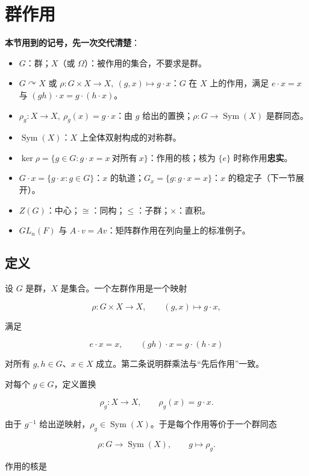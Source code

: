 \section{群作用}


\textbf{本节用到的记号，先一次交代清楚}：

\begin{itemize}
\item $G$：群；$X$（或 $\Omega$）：被作用的集合，不要求是群。
\item $G\curvearrowright X$ 或 $\rho:G\times X\to X,\ (g,x)\mapsto g\cdot x$：$G$ 在 $X$ 上的作用，满足 $e\cdot x=x$ 与 $(gh)\cdot x=g\cdot(h\cdot x)$。
\item $\rho_g:X\to X,\ \rho_g(x)=g\cdot x$：由 $g$ 给出的置换；$\rho:G\to\operatorname{Sym}(X)$ 是群同态。
\item $\operatorname{Sym}(X)$：$X$ 上全体双射构成的对称群。
\item $\ker\rho=\{g\in G:g\cdot x=x\ \text{对所有}\ x\}$：作用的核；核为 $\{e\}$ 时称作用\textbf{忠实}。
\item $G\cdot x=\{g\cdot x:g\in G\}$：$x$ 的轨道；$G_x=\{g:g\cdot x=x\}$：$x$ 的稳定子（下一节展开）。
\item $Z(G)$：中心；$\cong$：同构；$\le$：子群；$\times$：直积。
\item $GL_n(F)$ 与 $A\cdot v=Av$：矩阵群作用在列向量上的标准例子。
\end{itemize}


\subsection{定义}


设 $G$ 是群，$X$ 是集合。一个左群作用是一个映射

\[
\rho:G\times X\longrightarrow X,
\qquad (g,x)\longmapsto g\cdot x,
\]

满足

\[
 e\cdot x=x,
\qquad
(gh)\cdot x=g\cdot(h\cdot x)
\]

对所有 $g,h\in G$、$x\in X$ 成立。第二条说明群乘法与“先后作用”一致。

对每个 $g\in G$，定义置换

\[
\rho_g:X\to X,
\qquad \rho_g(x)=g\cdot x.
\]

由于 $g^{-1}$ 给出逆映射，$\rho_g\in\operatorname{Sym}(X)$。于是每个作用等价于一个群同态

\[
\rho:G\longrightarrow\operatorname{Sym}(X),
\qquad g\longmapsto\rho_g.
\]

作用的核是

